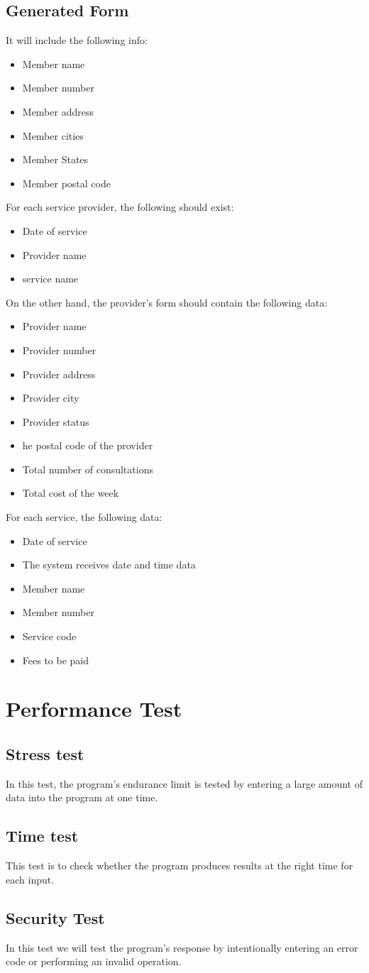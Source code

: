 \documentclass{article}
\begin{document}
\subsection{Generated Form}
It will include the following info:
\begin{itemize}
\item Member name
\item Member number
\item Member address
\item Member cities
\item Member States
\item Member postal code
\end{itemize}
For each service provider, the following should exist:
\begin{itemize}
   \item Date of service
   \item Provider name
   \item service name
\end{itemize}
On the other hand, the provider's form should contain the following data:
\begin{itemize}
   \item Provider name
   \item Provider number
   \item Provider address
   \item Provider city
   \item Provider status
   \item he postal code of the provider
   \item Total number of consultations
   \item Total cost of the week
\end{itemize}
For each service, the following data:
\begin{itemize}
   \item Date of service
   \item The system receives date and time data
   \item Member name
   \item Member number
   \item Service code
   \item Fees to be paid
\end{itemize}

\section{Performance Test}
\subsection{Stress test}
In this test, the program's endurance limit is tested by entering a large
amount of data into the program at one time.
\subsection{Time test}
This test is to check whether the program produces results at the right
time for each input.
\subsection{Security Test}
In this test we will test the program's response by intentionally entering an
error code or performing an invalid operation.
\end{document}
